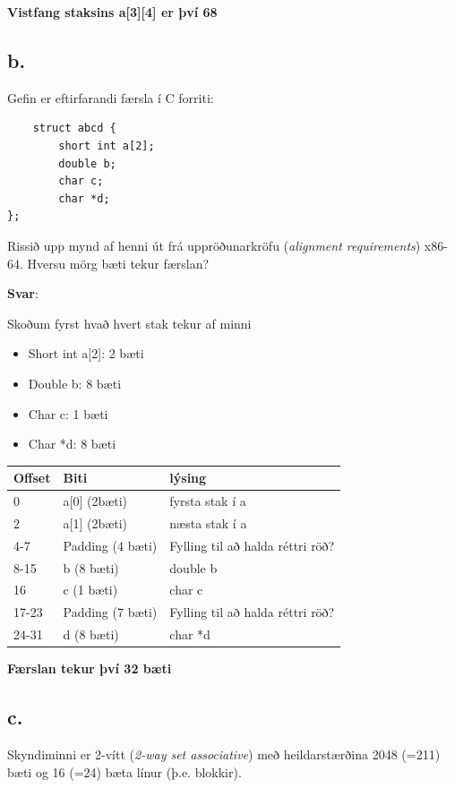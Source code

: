 \documentclass{article}
\begin{document}
\textbf{Vistfang staksins a[3][4] er því 68}


\subsection{b.} Gefin er eftirfarandi færsla í C forriti:

\begin{verbatim}
    struct abcd {
        short int a[2];
        double b;
        char c;
        char *d;
};
\end{verbatim}

Rissið upp mynd af henni út frá uppröðunarkröfu (\textit{alignment requirements}) x86-
64. Hversu mörg bæti tekur færslan?

\textbf{Svar}:

Skoðum fyrst hvað hvert stak tekur af minni

\begin{itemize}
    \item Short int a[2]: 2 bæti
    \item Double b: 8 bæti
    \item Char c: 1 bæti
    \item Char *d: 8 bæti
\end{itemize}

\begin{center}
    \begin{tabularx}{\textwidth}{|l|l|X|}
        \hline
        \textbf{Offset} & \textbf{Biti} & \textbf{lýsing} \\ \hline
        0 & a[0] (2bæti) & fyrsta stak í a \\ \hline
        2 & a[1] (2bæti) & næsta stak í a \\ \hline
        4-7 & Padding (4 bæti) & Fylling til að halda réttri röð? \\ \hline
        8-15 & b (8 bæti) & double b \\ \hline
        16 & c (1 bæti) & char c \\ \hline
        17-23 & Padding (7 bæti) & Fylling til að halda réttri röð? \\ \hline
        24-31 & d (8 bæti) & char *d \\ \hline
    \end{tabularx}
\end{center}

\textbf{Færslan tekur því 32 bæti}

\subsection{c.} Skyndiminni er 2-vítt (\textit{2-way set associative}) með heildarstærðina 2048 (=211)
bæti og 16 (=24) bæta línur (þ.e. blokkir).
\end{document}
